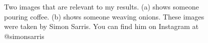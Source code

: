 \documentclass[12pt,letterpaper]{article}
\begin{document}
\begin{figure}[!t]
\begin{subfigure}[b]{0.45\textwidth}
         \caption{}
         \label{fig:img-2}
     \end{subfigure}
        \caption{Two images that are relevant to my results. (a) shows someone pouring coffee. (b) shows someone weaving onions. These images were taken by Simon Sarris. You can find him on Instagram at @simonsarris}
        \label{fig:two-images}
\end{figure}


\printbibliography
\end{document}
